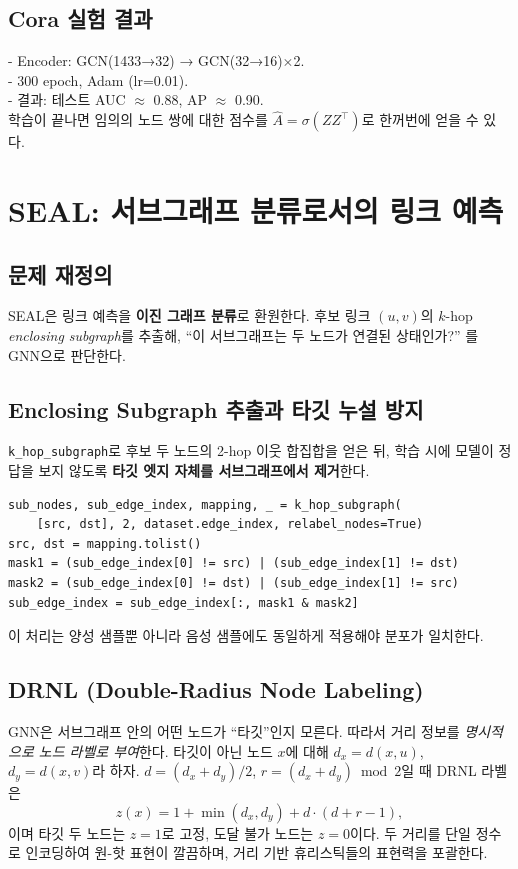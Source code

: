 \documentclass[11pt,a4paper]{article}
\begin{document}
\subsection{Cora 실험 결과}
- Encoder: GCN(1433→32) → GCN(32→16)$\times$2.\\
- 300 epoch, Adam (lr=0.01).\\
- 결과: 테스트 AUC $\approx$ 0.88, AP $\approx$ 0.90.\\
학습이 끝나면 임의의 노드 쌍에 대한 점수를 $\hat{A}=\sigma(ZZ^\top)$로 한꺼번에 얻을 수 있다.

\section{SEAL: 서브그래프 분류로서의 링크 예측}
\subsection{문제 재정의}
SEAL은 링크 예측을 \textbf{이진 그래프 분류}로 환원한다. 후보 링크 $(u,v)$의
$k$-hop \emph{enclosing subgraph}를 추출해, ``이 서브그래프는 두 노드가 연결된 상태인가?''
를 GNN으로 판단한다.

\subsection{Enclosing Subgraph 추출과 타깃 누설 방지}
\texttt{k\_hop\_subgraph}로 후보 두 노드의 2-hop 이웃 합집합을 얻은 뒤, 학습 시에 모델이
정답을 보지 않도록 \textbf{타깃 엣지 자체를 서브그래프에서 제거}한다.
\begin{lstlisting}
sub_nodes, sub_edge_index, mapping, _ = k_hop_subgraph(
    [src, dst], 2, dataset.edge_index, relabel_nodes=True)
src, dst = mapping.tolist()
mask1 = (sub_edge_index[0] != src) | (sub_edge_index[1] != dst)
mask2 = (sub_edge_index[0] != dst) | (sub_edge_index[1] != src)
sub_edge_index = sub_edge_index[:, mask1 & mask2]
\end{lstlisting}
이 처리는 양성 샘플뿐 아니라 음성 샘플에도 동일하게 적용해야 분포가 일치한다.

\subsection{DRNL (Double-Radius Node Labeling)}
GNN은 서브그래프 안의 어떤 노드가 ``타깃''인지 모른다. 따라서 거리 정보를 \emph{명시적으로 노드 라벨로 부여}한다.
타깃이 아닌 노드 $x$에 대해 $d_x=d(x,u)$, $d_y=d(x,v)$라 하자.
$d=(d_x+d_y)/2$, $r=(d_x+d_y) \bmod 2$일 때 DRNL 라벨은
\begin{equation*}
  z(x) = 1 + \min(d_x, d_y) + d\cdot(d+r-1),
\end{equation*}
이며 타깃 두 노드는 $z=1$로 고정, 도달 불가 노드는 $z=0$이다. 두 거리를 단일 정수로 인코딩하여
원-핫 표현이 깔끔하며, 거리 기반 휴리스틱들의 표현력을 포괄한다.
\end{document}
